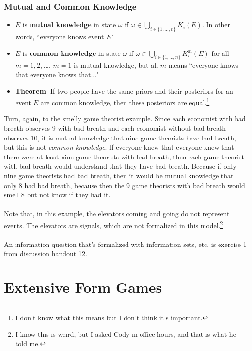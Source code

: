 \documentclass{article}
\newcommand{\red}[1]{{\color{red}#1}}
\begin{document}
\subsubsection{Mutual and Common Knowledge}
\begin{itemize}
	\item $E$ is \textbf{mutual knowledge} in state $\omega$ if ${\omega\in\bigcup_{i\in\{1,...,n\}}K_i(E)}$. In other words, ``everyone knows event $E$"
	\item $E$ is \textbf{common knowledge} in state $\omega$ if ${\omega\in\bigcup_{i\in\{1,...,n\}}K_i^m(E)}$ for all ${m=1,2,...}$. ${m=1}$ is mutual knowledge, but all $m$ means ``everyone knows that everyone knows that..."
	\item \textbf{Theorem:} If two people have the same priors and their posteriors for an event $E$ are common knowledge, then these posteriors are equal.\footnote{I don't know what this means but I don't think it's important.}
\end{itemize}
Turn, again, to the smelly game theorist example. Since each economist with bad breath observes 9 with bad breath and each economist without bad breath observes 10, it is mutual knowledge that nine game theorists have bad breath, but this is not \textit{common knowledge}. If everyone knew that everyone knew that there were at least nine game theorists with bad breath, then each game theorist with bad breath would understand that they have bad breath. Because if only nine game theorists had bad breath, then it would be mutual knowledge that only 8 had bad breath, because then the 9 game theorists with bad breath would smell 8 but not know if they had it. \\
\\
Note that, in this example, the elevators coming and going do not represent events. The elevators are signals, which are not formalized in this model.\footnote{I know this is weird, but I asked Cody in office hours, and that is what he told me.} \\
\\
\red{An information question that's formalized with information sets, etc. is exercise 1 from discussion handout 12.}


\section{Extensive Form Games}
\end{document}
